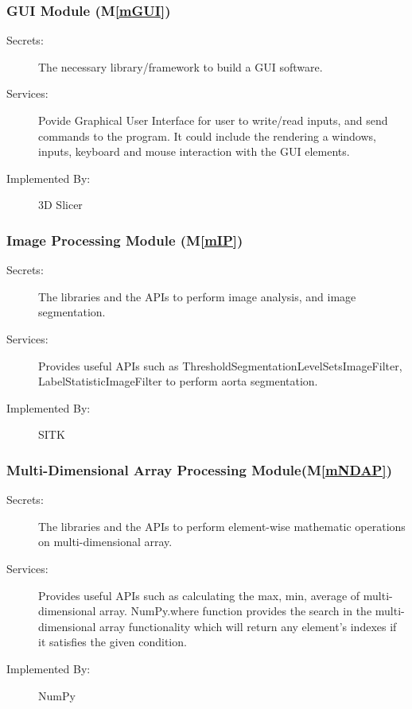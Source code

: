 \documentclass[12pt, titlepage]{article}
\newcommand{\mref}[1]{M\ref{#1}}
\begin{document}
\subsubsection{GUI Module (\mref{mGUI})}
\begin{description}
\item[Secrets:]The necessary library/framework to build a GUI software.
\item[Services:]Povide Graphical User Interface for user to write/read inputs, and send commands to the program. It could include the rendering a windows, inputs, keyboard and mouse interaction with the GUI elements.
\item[Implemented By:] 3D Slicer
\end{description}

\subsubsection{Image Processing Module (\mref{mIP})}
\begin{description}
\item[Secrets:] The libraries and the APIs to perform image analysis, and image segmentation.
\item[Services:] Provides useful APIs such as ThresholdSegmentationLevelSetsImageFilter, LabelStatisticImageFilter to perform aorta segmentation.
\item[Implemented By:] SITK
\end{description}

\subsubsection{Multi-Dimensional Array Processing Module(\mref{mNDAP})}
\begin{description}
\item[Secrets:] The libraries and the APIs to perform element-wise mathematic operations on multi-dimensional array.
\item[Services:] Provides useful APIs such as calculating the max, min, average of multi-dimensional array. NumPy.where function provides the search in the multi-dimensional array functionality which will return any element's indexes if it satisfies the given condition.
\item[Implemented By:] NumPy
\end{description}
\end{document}

